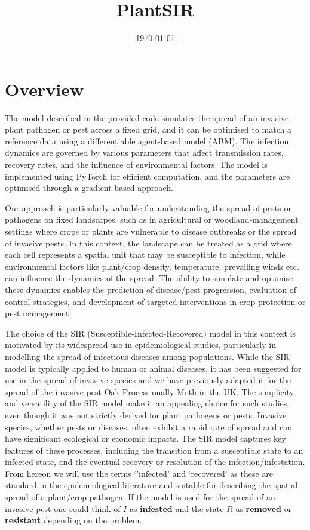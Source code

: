 \documentclass[12pt]{article}
\title{PlantSIR}
\author{}
\date{\today}
\begin{document}
\maketitle

\section{Overview}

The model described in the provided code simulates the spread of an invasive plant pathogen or pest across a fixed grid, and it can be optimised to match a reference data using a differentiable agent-based model (ABM). The infection dynamics are governed by various parameters that affect transmission rates, recovery rates, and the influence of environmental factors. The model is implemented using PyTorch for efficient computation, and the parameters are optimised through a gradient-based approach.

Our approach is particularly valuable for understanding the spread of pests or pathogens on fixed landscapes, such as in agricultural or woodland-management settings where crops or plants are vulnerable to disease outbreaks or the spread of invasive pests. In this context, the landscape can be treated as a grid where each cell represents a spatial unit that may be susceptible to infection, while environmental factors like plant/crop density, temperature, prevailing winds etc. can influence the dynamics of the spread. The ability to simulate and optimise these dynamics enables the prediction of disease/pest progression, evaluation of control strategies, and development of targeted interventions in crop protection or pest management.

The choice of the SIR (Susceptible-Infected-Recovered) model in this context is motivated by its widespread use in epidemiological studies, particularly in modelling the spread of infectious diseases among populations. While the SIR model is typically applied to human or animal diseases, it has been suggested for use in the spread of invasive species and we have previously adapted it for the spread of the invasive pest Oak Processionally Moth in the UK. The simplicity and versatility of the SIR model make it an appealing choice for such studies, even though it was not strictly derived for plant pathogens or pests. Invasive species, whether pests or diseases, often exhibit a rapid rate of spread and can have significant ecological or economic impacts. The SIR model captures key features of these processes, including the transition from a susceptible state to an infected state, and the eventual recovery or resolution of the infection/infestation. From hereon we will use the terms `'infected' and `recovered' as these are standard in the epidemiological literature and suitable for describing the spatial spread of a plant/crop pathogen. If the model is used for the spread of an invasive pest one could think of $I$ as {\bf infested} and the state $R$ as {\bf removed} or {\bf resistant} depending on the problem.
\end{document}
